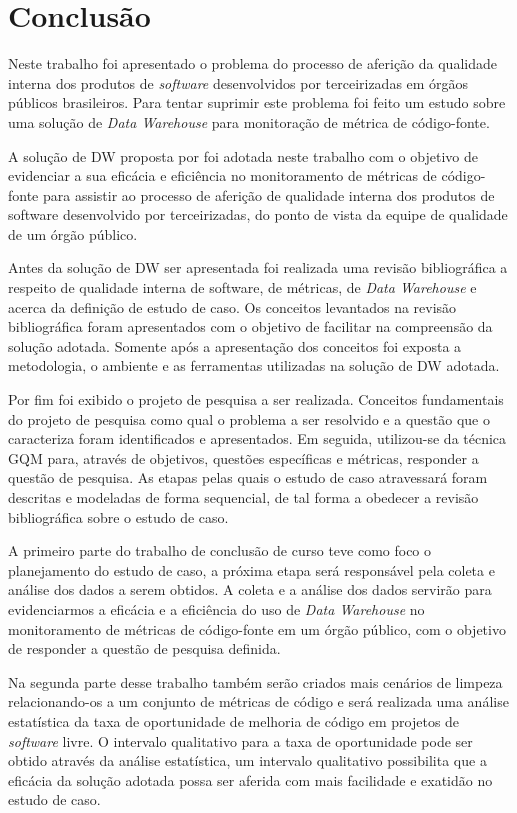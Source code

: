 \chapter{Conclusão}

Neste trabalho foi apresentado o problema do processo de aferição da qualidade interna dos produtos de \textit{software} desenvolvidos por terceirizadas em órgãos públicos brasileiros. Para tentar suprimir este problema foi feito um estudo sobre uma solução de \textit{Data Warehouse} para monitoração de métrica de código-fonte.

A solução de DW proposta por  foi adotada neste trabalho com o objetivo de evidenciar a sua eficácia e eficiência no monitoramento de métricas de código-fonte para assistir ao processo de aferição de qualidade interna dos produtos de software desenvolvido por terceirizadas, do ponto de vista da equipe de qualidade de um órgão público. 

Antes da solução de DW ser apresentada foi realizada uma revisão bibliográfica a respeito de qualidade interna de software, de métricas, de \textit{Data Warehouse} e acerca da definição de estudo de caso. Os conceitos levantados na revisão bibliográfica foram apresentados com o objetivo de facilitar na compreensão da solução adotada. Somente após  a apresentação dos conceitos foi exposta a metodologia, o ambiente e as ferramentas utilizadas na solução de DW adotada. 

Por fim foi  exibido o projeto de pesquisa a ser realizada. Conceitos fundamentais do projeto de pesquisa como qual o problema a ser resolvido e a questão que o caracteriza foram identificados e apresentados. Em seguida, utilizou-se da  técnica GQM para, através de objetivos, questões específicas e métricas, responder a questão de pesquisa. As etapas pelas quais o estudo de caso atravessará foram descritas e modeladas de forma sequencial, de tal forma a obedecer a revisão bibliográfica sobre o estudo de caso.

A primeiro parte do trabalho de conclusão de curso teve como foco o planejamento do estudo de caso, a próxima etapa será responsável pela coleta e análise dos dados a serem obtidos. A coleta e a análise dos dados servirão para evidenciarmos a eficácia e a eficiência do uso de \textit{Data Warehouse} no monitoramento de métricas de código-fonte em um órgão público, com o objetivo de responder a questão de pesquisa definida.

Na segunda parte desse trabalho também serão criados mais cenários de limpeza relacionando-os a um conjunto de métricas de código e será realizada uma análise estatística da taxa de oportunidade de melhoria de código em projetos de \textit{software} livre. O intervalo qualitativo para a taxa de oportunidade pode ser obtido através da análise estatística, um intervalo qualitativo possibilita que a eficácia da solução adotada possa ser aferida com mais facilidade e exatidão no estudo de caso.   